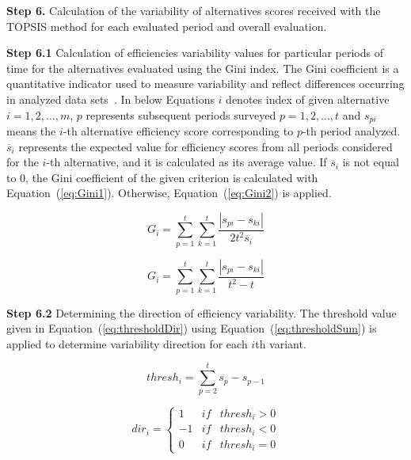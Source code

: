 \documentclass[final,5p,times,twocolumn,authoryear]{elsarticle}
\begin{document}
\textbf{Step 6.} Calculation of the variability of alternatives scores received with the TOPSIS method for each evaluated period and overall evaluation.

\textbf{Step 6.1} Calculation of efficiencies variability values for particular periods of time for the alternatives evaluated using the Gini index. 
The Gini coefficient is a quantitative indicator used to measure variability and reflect differences occurring in analyzed data sets~\citep{lai2020sustainable}. In below Equations $i$ denotes index of given alternative $i = 1, 2, \ldots , m$, $p$ represents subsequent periods surveyed $p = 1, 2, \ldots, t$ and $s_{pi}$ means the $i$-th alternative efficiency score corresponding to $p$-th period analyzed. $\overline{s}_{i}$ represents the expected value for efficiency scores from all periods considered for the $i$-th alternative, and it is calculated as its average value. If $\overline{s}_{i}$ is not equal to 0, the Gini coefficient of the given criterion is calculated with Equation~(\ref{eq:Gini1}). Otherwise, Equation~(\ref{eq:Gini2}) is applied.

\begin{equation}
    G_{i} = \sum_{p=1}^{t} \sum_{k=1}^{t} \frac{|s_{pi} - s_{ki}|}{2t^{2}\overline{s}_{i}}
    \label{eq:Gini1}
\end{equation}

\begin{equation}
    G_{i} = \sum_{p=1}^{t} \sum_{k=1}^{t} \frac{|s_{pi} - s_{ki}|}{t^{2} - t}
    \label{eq:Gini2}
\end{equation}

\textbf{Step 6.2} Determining the direction of efficiency variability. The threshold value given in Equation~(\ref{eq:thresholdDir}) using Equation~(\ref{eq:thresholdSum}) is applied to determine variability direction for each $i$th variant.

\begin{equation}
    thresh_{i} = \sum_{p=2}^{t} s_{p} - s_{p-1}
    \label{eq:thresholdSum}
\end{equation}

\begin{equation}
\label{eq:thresholdDir}
dir_i = \left \{ \begin{array}{lll}
1 & if & thresh_{i} > 0  \\
-1 & if & thresh_{i} < 0  \\
0 & if & thresh_{i} = 0
\end{array} \right.
\end{equation}
\end{document}
